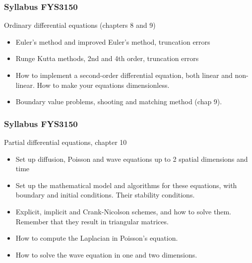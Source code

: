 \documentclass{beamer}
\begin{document}
\begin{frame}
\frametitle{Syllabus FYS3150}

\begin{block}{Ordinary differential equations (chapters 8 and 9) }
\begin{itemize}
  \item Euler's method and improved Euler's method, truncation errors

  \item Runge Kutta methods, 2nd and 4th order, truncation errors

  \item How to implement a second-order differential equation, both linear and non-linear. How to make your equations dimensionless.

  \item Boundary value problems, shooting and matching method (chap 9).
\end{itemize}

\noindent
\end{block}
\end{frame}

\begin{frame}
\frametitle{Syllabus FYS3150}

\begin{block}{Partial differential equations, chapter 10 }
\begin{itemize}
  \item Set up diffusion, Poisson and wave equations up to 2 spatial dimensions and time

  \item Set up the mathematical model and algorithms for these equations, with boundary and initial conditions. Their stability conditions.

  \item Explicit, implicit and Crank-Nicolson schemes, and how to solve them. Remember that they result in triangular matrices.

  \item How to compute the Laplacian in Poisson's equation.

  \item How to solve the wave equation in one and two dimensions.
\end{itemize}

\noindent
\end{block}
\end{frame}
\end{document}
